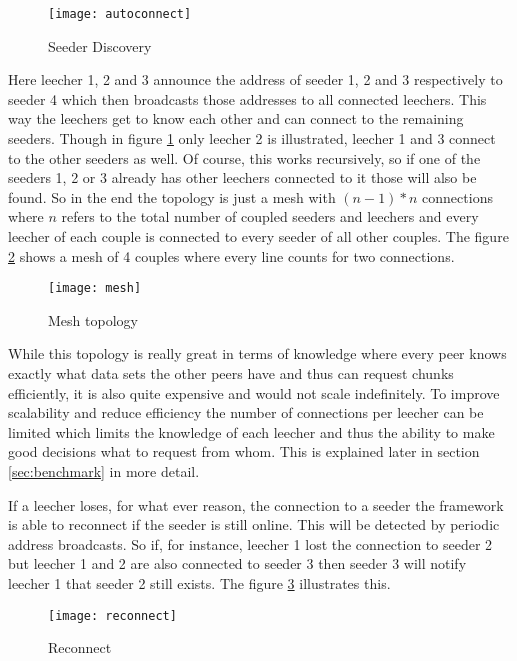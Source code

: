 \begin{figure}[H]
\centering
\texttt{[image: autoconnect]}
\caption{Seeder Discovery}
\label{fig:autoconnect}
\end{figure}

Here leecher 1, 2 and 3 announce the address of seeder 1, 2 and 3 respectively to seeder 4 which then broadcasts those addresses to all connected leechers. This way the leechers get to know each other and can connect to the remaining seeders. Though in figure \ref{fig:autoconnect} only leecher 2 is illustrated, leecher 1 and 3 connect to the other seeders as well. Of course, this works recursively, so if one of the seeders 1, 2 or 3 already has other leechers connected to it those will also be found. So in the end the topology is just a mesh with $(n-1)*n$ connections where $n$ refers to the total number of coupled seeders and leechers and every leecher of each couple is connected to every seeder of all other couples. The figure \ref{fig:mesh} shows a mesh of 4 couples where every line counts for two connections.

\begin{figure}[H]
\centering
\texttt{[image: mesh]}
\caption{Mesh topology}
\label{fig:mesh}
\end{figure}

While this topology is really great in terms of knowledge where every peer knows exactly what data sets the other peers have and thus can request chunks efficiently, it is also quite expensive and would not scale indefinitely. To improve scalability and reduce efficiency the number of connections per leecher can be limited which limits the knowledge of each leecher and thus the ability to make good decisions what to request from whom. This is explained later in section \ref{sec:benchmark} in more detail.

If a leecher loses, for what ever reason, the connection to a seeder the framework is able to reconnect if the seeder is still online. This will be detected by periodic address broadcasts. So if, for instance, leecher 1 lost the connection to seeder 2 but leecher 1 and 2 are also connected to seeder 3 then seeder 3 will notify leecher 1 that seeder 2 still exists. The figure \ref{fig:reconnect} illustrates this.

\begin{figure}[H]
\centering
\texttt{[image: reconnect]}
\caption{Reconnect}
\label{fig:reconnect}
\end{figure}



